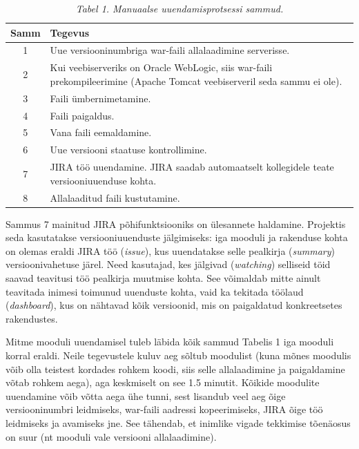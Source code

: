 \documentclass[12pt]{article}
\begin{document}
  \begin{table}[H]
    \caption*{\textit{Tabel 1. Manuaalse uuendamisprotsessi sammud.}}
  
    \begin{tabular}{ |c|p{11cm}| }
      \hline
      \textbf{Samm} & \textbf{Tegevus}\\
      \hline
      1 & Uue versiooninumbriga war\--faili allalaadimine serverisse.\\
      \hline
      2 & Kui veebiserveriks on Oracle WebLogic, siis war\--faili prekompileerimine (Apache Tomcat veebiserveril seda sammu ei ole).\\
      \hline
      3 & Faili ümbernimetamine.\\
      \hline
      4 & Faili paigaldus.\\
      \hline
      5 & Vana faili eemaldamine.\\
      \hline
      6 & Uue versiooni staatuse kontrollimine.\\
      \hline
      7 & JIRA\footnotemark{} töö uuendamine. JIRA saadab automaatselt kollegidele teate versiooniuuenduse kohta.\\
      \hline
      8 & Allalaaditud faili kustutamine.\\
      \hline
    \end{tabular}
  \end{table}
  
  
  Sammus 7 mainitud JIRA põhifunktsiooniks on ülesannete haldamine. Projektis seda kasutatakse versiooniuuenduste jälgimiseks: iga mooduli ja rakenduse kohta on olemas eraldi JIRA töö (\textit{issue}), kus uuendatakse selle pealkirja (\textit{summary}) versioonivahetuse järel. Need kasutajad, kes jälgivad (\textit{watching}) selliseid töid saavad teavitusi töö pealkirja muutmise kohta. See võimaldab mitte ainult teavitada inimesi toimunud uuenduste kohta, vaid ka tekitada töölaud (\textit{dashboard}), kus on nähtavad kõik versioonid, mis on paigaldatud konkreetsetes rakendustes.
  
  Mitme mooduli uuendamisel tuleb läbida kõik sammud Tabelis 1 iga mooduli korral eraldi. Neile tegevustele kuluv aeg sõltub moodulist (kuna mõnes moodulis võib olla teistest kordades rohkem koodi, siis selle allalaadimine ja paigaldamine võtab rohkem aega), aga keskmiselt on see 1.5 minutit. Kõikide moodulite uuendamine võib võtta aega ühe tunni, sest lisandub veel aeg õige versiooninumbri leidmiseks, war\--faili aadressi kopeerimiseks, JIRA õige töö leidmiseks ja avamiseks jne. See tähendab, et inimlike vigade tekkimise tõenäosus on suur (nt mooduli vale versiooni allalaadimine).
  
\end{document}
